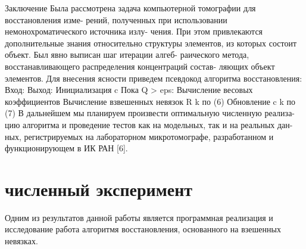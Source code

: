 Заключение
Была рассмотрена задача компьютерной томографии для восстановления изме-
рений, полученных при использовании немонохроматического источника излу-
чения. При этом привлекаются дополнительные знания относительно структуры
элементов, из которых состоит объект. Был явно выписан шаг итерации алгеб-
раического метода, восстанавливающего распределения концентраций состав-
ляющих объект элементов.
Для внесения ясности приведем псевдокод алгоритма восстановления:
Вход: %
Выход: %
Инициализация c
Пока Q > eps:
Вычисление весовых коэффициентов %
Вычисление взвешенных невязок R k по (6)
Обновление c k по (7)
В дальнейшем мы планируем произвести оптимальную численную реализа-
цию алгоритма и проведение тестов как на модельных, так и на реальных дан-
ных, регистрируемых на лабораторном микротомографе, разработанном и
функционирующем в ИК РАН [6].

\section{численный эксперимент } \label{sect_3_2}
Одним из результатов данной работы является программная реализация и исследование работа алгоритмя восстановления, основанного на взешенных невязках.

